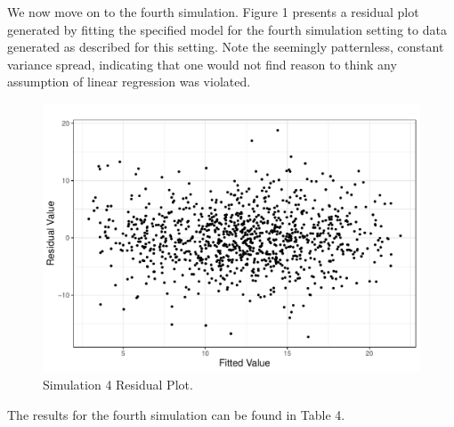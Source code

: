 \documentclass[submit]{smj}
\begin{document}
We now move on to the fourth simulation. Figure 1 presents a residual plot generated by fitting the specified model for the fourth simulation setting to data generated as described for this setting.
Note the seemingly patternless, constant variance spread, indicating that one would not find reason to think any assumption of linear regression was violated. 

\begin{figure}[H]
\includegraphics[width=4.5in]{figures/sim3_residual_plot.pdf}\par
\caption{Simulation 4 Residual Plot.}
\centering
\end{figure}

The results for the fourth simulation can be found in Table 4.

\begin{table}[H]
	\centering
	\small\addtolength{\tabcolsep}{-3pt}
	\setlength\extrarowheight{-3pt}
	{
	}
	\end{table}
\end{document}
